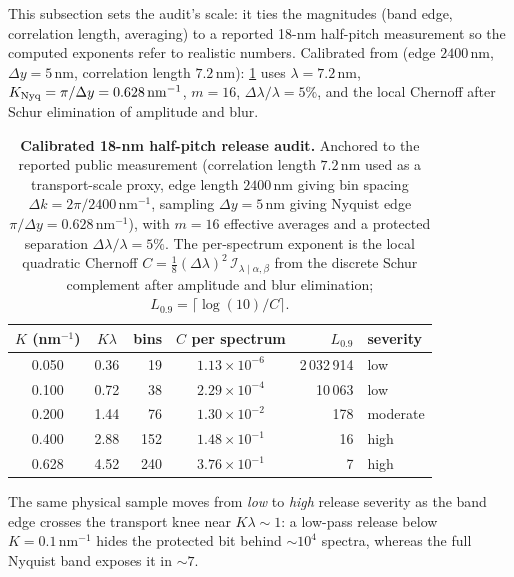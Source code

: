 \documentclass[11pt]{article}
\begin{document}
This subsection sets the audit's scale: it ties the magnitudes (band edge, correlation length, averaging) to a reported 18-nm half-pitch measurement so the computed exponents refer to realistic numbers. Calibrated from \cite{mack2017level} (edge \(2400\,\mathrm{nm}\), \(\Delta y=5\,\mathrm{nm}\), correlation length \(7.2\,\mathrm{nm}\)): \cref{tab:published-scale} uses \(\lambda=7.2\,\mathrm{nm}\), \(K_{\rm Nyq}=\pi/\Delta y=0.628\,\mathrm{nm}^{-1}\), \(m=16\), \(\Delta\lambda/\lambda=5\%\), and the local Chernoff after Schur elimination of amplitude and blur.

\begin{table}[htbp]
\centering
\small
\renewcommand{\arraystretch}{1.15}
\caption{\textbf{Calibrated 18-nm half-pitch release audit.} Anchored to the reported public measurement (correlation length $7.2\,\mathrm{nm}$ used as a transport-scale proxy, edge length $2400\,\mathrm{nm}$ giving bin spacing $\Delta k=2\pi/2400\,\mathrm{nm}^{-1}$, sampling $\Delta y=5\,\mathrm{nm}$ giving Nyquist edge $\pi/\Delta y=0.628\,\mathrm{nm}^{-1}$), with $m=16$ effective averages and a protected separation $\Delta\lambda/\lambda=5\%$. The per-spectrum exponent is the local quadratic Chernoff $C=\tfrac18(\Delta\lambda)^2\,\mathcal{I}_{\lambda\mid\alpha,\beta}$ from the discrete Schur complement after amplitude and blur elimination; $L_{0.9}=\lceil\log(10)/C\rceil$.}
\label{tab:published-scale}
\setlength{\tabcolsep}{6pt}
\begin{tabular}{c c r c r l}
\toprule
{$K$ (nm$^{-1}$)} & {$K\lambda$} & {bins} & {$C$ per spectrum} & {$L_{0.9}$} & {severity} \\
\midrule
0.050 & 0.36 & 19 & $1.13\times10^{-6}$ & 2\,032\,914 & low \\
0.100 & 0.72 & 38 & $2.29\times10^{-4}$ & 10\,063 & low \\
0.200 & 1.44 & 76 & $1.30\times10^{-2}$ & 178 & moderate \\
0.400 & 2.88 & 152 & $1.48\times10^{-1}$ & 16 & high \\
0.628 & 4.52 & 240 & $3.76\times10^{-1}$ & 7 & high \\
\bottomrule
\end{tabular}
\par\vspace{3pt}
\begin{minipage}{0.92\linewidth}\footnotesize The same physical sample moves from \emph{low} to \emph{high} release severity as the band edge crosses the transport knee near $K\lambda\sim1$: a low-pass release below $K=0.1\,\mathrm{nm}^{-1}$ hides the protected bit behind $\sim\!10^{4}$ spectra, whereas the full Nyquist band exposes it in $\sim\!7$.\end{minipage}
\end{table}
\end{document}

